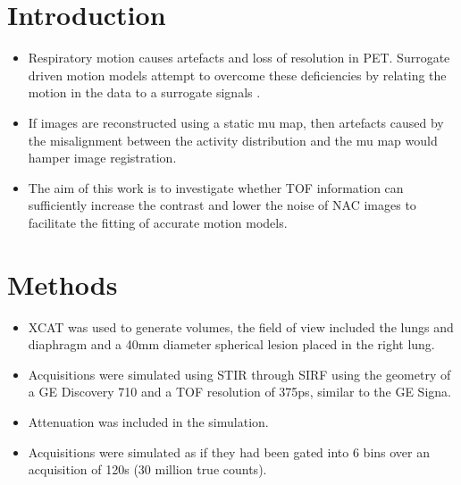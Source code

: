 \documentclass[portrait,color=UCLburgundy,margin=2cm]{uclposter}
\begin{document}
\begin{multicols}{2}
\normalsize

\section*{Introduction}
\begin{highlightbox}[UCLlightgreen]
    \begin{itemize}
        \item Respiratory motion causes artefacts and loss of resolution in PET. Surrogate driven motion models attempt to overcome these deficiencies by relating the motion in the data to a surrogate signals \cite{McClelland2017}.
        \item If images are reconstructed using a static \gls{mu map}, then artefacts caused by the misalignment between the activity distribution and the \gls{mu map} would hamper image registration.
        \item The aim of this work is to investigate whether \gls{TOF} information can sufficiently increase the contrast and lower the noise of \gls{NAC} images to facilitate the fitting of accurate motion models.
    \end{itemize}
\end{highlightbox}

\section*{Methods}
\begin{itemize}

    \vspace{1.0cm}
    
    \subsection*{\underline{\textbf{Simulation}}}
    
    \vspace{-1.0cm}
    
    \item XCAT was used to generate volumes, the field of view included the lungs and diaphragm and a 40mm diameter spherical lesion placed in the right lung.
    \item  Acquisitions were simulated using STIR \cite{Efthimiou2018} through SIRF using the geometry of a GE Discovery 710 and a \gls{TOF} resolution of 375ps, similar to the GE Signa.
    \item Attenuation was included in the simulation.
    \item  Acquisitions were simulated as if they had been gated into 6 bins over an acquisition of 120s (30 million true counts).
    

\end{itemize}
\end{multicols}
\end{document}
